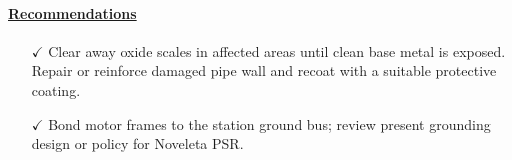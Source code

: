 \paragraph{\underline{Recommendations}} 
\begin{itemize}
	\item [$\checkmark$] Clear away oxide scales in affected areas until clean base metal is exposed. Repair or reinforce damaged pipe wall and recoat with a suitable protective coating.
	\item [$\checkmark$] Bond motor frames to the station ground bus; review present grounding design or policy for Noveleta PSR.

\end{itemize}

%